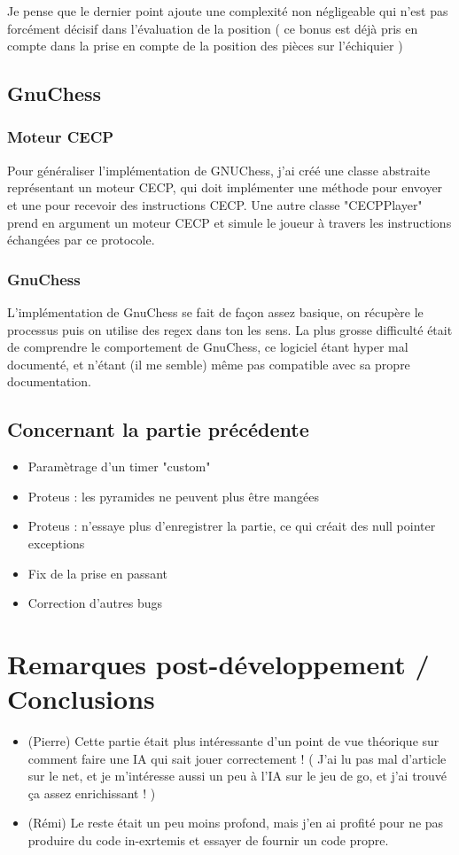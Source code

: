 \documentclass{article}
\begin{document}
Je pense que le dernier point ajoute une complexité non négligeable qui n'est pas forcément décisif dans l'évaluation de la position ( ce bonus est déjà pris en compte dans la prise en compte de la position des pièces sur l'échiquier )

\subsection{GnuChess}

\subsubsection{Moteur CECP}
Pour généraliser l'implémentation de GNUChess, j'ai créé une classe abstraite représentant un moteur CECP, qui doit implémenter une méthode pour envoyer et une pour recevoir des instructions CECP. Une autre classe "CECPPlayer" prend en argument un moteur CECP et simule le joueur à travers les instructions échangées par ce protocole.

\subsubsection{GnuChess}
L'implémentation de GnuChess se fait de façon assez basique, on récupère le processus puis on utilise des regex dans ton les sens.
La plus grosse difficulté était de comprendre le comportement de GnuChess, ce logiciel étant hyper mal documenté, et n'étant (il me semble) même pas compatible avec sa propre documentation.

\subsection{Concernant la partie précédente}

\begin{itemize}
    \item Paramètrage d'un timer "custom"
    \item Proteus : les pyramides ne peuvent plus être mangées
    \item Proteus : n'essaye plus d'enregistrer la partie, ce qui créait des null pointer exceptions
    \item Fix de la prise en passant
    \item Correction d'autres bugs
\end{itemize}

\section{Remarques post-développement / Conclusions}
\begin{itemize}
    \item (Pierre) Cette partie était plus intéressante d'un point de vue théorique sur comment faire une IA qui sait jouer correctement ! ( J'ai lu pas mal d'article sur le net, et je m'intéresse aussi un peu à l'IA sur le jeu de go, et j'ai trouvé ça assez enrichissant ! )
    \item (Rémi) Le reste était un peu moins profond, mais j'en ai profité pour ne pas produire du code in-exrtemis et essayer de fournir un code propre.

\end{itemize}
\end{document}
